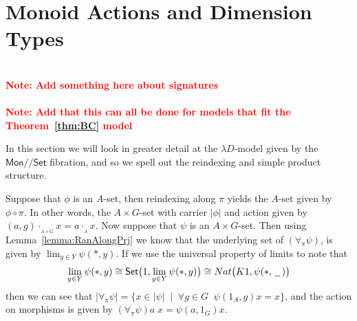 \documentclass[a4paper,UKenglish]{lipics}
\newcommand\note[1]{{ \bf \textcolor{red} {\vspace{2mm}\; \\ Note: #1\\}}}
\newcommand{\ra}{\rightarrow}
\newcommand{\msf}[1]{\mathsf{#1}} %
\newcommand{\Mon}{\msf{Mon}}
\newcommand{\Set}{\msf{Set}}
\newcommand{\C}{\mathcal{C}}
\newcommand{\D}{\mathcal{D}}
\newcommand{\E}{\mathcal{E}}
\newcommand{\blank}{\, \underline{\hspace{2mm}} \,}
\newcommand{\act}[1]{\cdot_{_{#1}}}
\newcommand{\GroupSet}[1]{#1/\!/\Set}
\newcommand{\MonSet}{\GroupSet{\Mon}}
\newcommand{\bbracket}[1]{\bigl( #1 \bigr)}
\newcommand{\UoMFibration}{UoM-fibration\xspace}
\begin{document}
%





\section{Monoid Actions and Dimension Types}\label{sec:MonSet}
\note{Add something here about signatures}
\note{Add that this can all be done for models that fit the Theorem~\ref{thm:BC} model}

In this section we will look in greater detail at the $\lambda D$-model given by the $\MonSet$ fibration, and so we spell out the reindexing and simple product structure.

Suppose that $\phi$ is an $A$-set, then reindexing along $\pi$ yields the $A$-set given by $\phi \circ \pi$. In other words, the $A \times G$-set with carrier $|\phi|$ and action given by $(a,g) \act{A\times G} x = a \act{A} x$. Now suppose that $\psi$ is an $A \times G$-set. Then using Lemma~\ref{lemma:RanAlongPrj} we know that the underlying set of $ (\forall _\pi \psi)$, is given by $\lim_{y\in Y} \psi (\ast, y)$. If we use the universal property of limits to note that
\[
 \lim_{y\in Y} \psi (\ast, y) \cong \Set \bbracket{1, \lim_{y\in Y} \psi (\ast, y)} \cong Nat \bbracket{K1, \psi (\ast, \blank)}
\]
then we can see that $|\forall_\pi \psi | = \{x \in |\psi| \; \; | \; \; \forall g\in G \; \; \psi(1_A, g) x = x \}$, and the action on morphisms is given by $(\forall_\pi \psi) a \; x = \psi (a, 1_G) x$.
\end{document}
